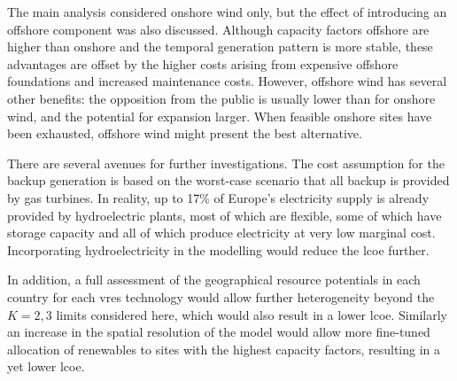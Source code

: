 \documentclass[a4paper, 5p, sort&compress]{elsarticle}%
\begin{document}

The main analysis considered onshore wind only, but the effect of
introducing an offshore component was also discussed. Although
capacity factors offshore are higher than onshore and the temporal
generation pattern is more stable, these advantages are offset by the
higher costs arising from expensive offshore foundations and increased
maintenance costs. However, offshore wind has several other benefits:
the opposition from the public is usually lower than for onshore wind,
and the potential for expansion larger. When feasible onshore sites
have been exhausted, offshore wind might present the best alternative.


There are several avenues for further investigations. The cost assumption for the backup generation is based on the
worst-case scenario that all backup is provided by gas turbines. In
reality, up to 17\% of Europe's electricity supply is already provided
by hydroelectric plants, most of which are flexible, some of which
have storage capacity and all of which produce electricity at very low
marginal cost. Incorporating hydroelectricity in the modelling would
reduce the \gls{lcoe} further.

In addition, a full assessment of the geographical resource potentials
in each country for each \gls{vres} technology would allow further
heterogeneity beyond the $K=2,3$ limits considered here, which would
also result in a lower \gls{lcoe}. Similarly an increase in the
spatial resolution of the model would allow more fine-tuned allocation
of renewables to sites with the highest capacity factors, resulting in a yet lower \gls{lcoe}.
\end{document}
